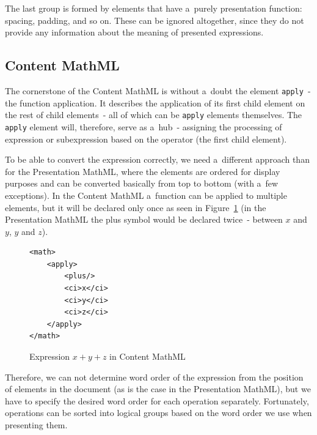 \documentclass[11pt,oneside,final]{fithesis2}
\def\s#1{#1\index{#1}}
\begin{document}
The last group is formed by elements that have a~purely presentation function: spacing, padding, and so on. These can be ignored altogether, since they do not provide any information about the meaning of presented expressions.


\subsection{Content MathML}
\label{section:analysis-content}
The cornerstone of the \s{Content MathML} is without a~doubt the element \texttt{apply}~- the function application. It describes the application of its first child element on the rest of child elements~- all of which can be \texttt{apply} elements themselves. The \texttt{apply} element will, therefore, serve as a~hub~- assigning the processing of expression or subexpression based on the operator (the first child element).

To be able to convert the expression correctly, we need a~different approach than for the Presentation MathML, where the elements are ordered for display purposes and can be converted basically from top to bottom (with a~few exceptions). In the Content MathML a~function can be applied to multiple elements, but it will be declared only once as seen in Figure~\ref{fig:mathplus} (in the Presentation MathML the plus symbol would be declared twice~- between $x$ and $y$, $y$ and $z$).

\begin{figure}[!ht]
\lstset{language=XML,frame=lines}
\begin{lstlisting}
<math>
	<apply>
		<plus/>
		<ci>x</ci>
		<ci>y</ci>
		<ci>z</ci>
	</apply>
</math>
\end{lstlisting}
\caption{Expression $x+y+z$ in Content MathML}
\label{fig:mathplus}
\end{figure}

Therefore, we can not determine word order of the expression from the position of elements in the document (as is the case in the Presentation MathML), but we have to specify the desired word order for each operation separately. Fortunately, operations can be sorted into logical groups based on the word order we use when presenting them.
\end{document}
